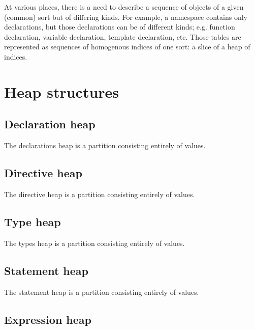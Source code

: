 \label{sec:ifc-heaps}

At various places, there is a need to describe a sequence of objects of a given (common) sort but of differing kinds.  
For example, a namespace contains only declarations, but those declarations can be of different kinds; e.g. function declaration, variable declaration,
template declaration, etc.  Those tables are represented as sequences of homogenous indices of one sort: a slice of a heap of indices.

\section{Heap structures}
\label{sec:ifc:heap-structures}

\subsection{Declaration heap}
\label{sec:ifc-decl-heap}

The declarations heap is a partition consisting entirely of  values.


\subsection{Directive heap}
\label{sec:ifc-dir-heap}

The directive heap is a partition consisting entirely of  values.



\subsection{Type heap}
\label{sec:ifc-type-heap}

The types heap is a partition consisting entirely of  values.



\subsection{Statement heap}
\label{sec:ifc-stmt-heap}

The statement heap is a partition consisting entirely of  values.



\subsection{Expression heap}
\label{sec:ifc-expr-heap}

